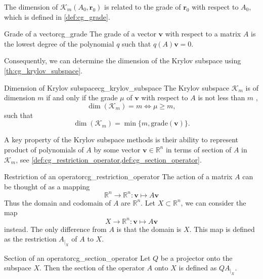 The dimension of $\mathcal{K}_m(A_0, \mathbf{r}_0)$ is related to the grade of $\mathbf{r}_0$ with respect to $A_0$, which is defined in \cref{def:cg_grade}.
\begin{fancydef}{Grade of a vector}{cg_grade}
  The grade of a vector $\mathbf{v}$ with respect to a matrix $A$ is the lowest degree of the polynomial $q$ such that $q(A)\mathbf{v} = 0$.
\end{fancydef}
Consequently, we can determine the dimension of the Krylov subspace using \cref{th:cg_krylov_subspace}.
\begin{fancyth}{Dimension of Krylov subspace}{cg_krylov_subspace}
  The Krylov subspace $\mathcal{K}_m$ is of dimension $m$ if and only if the grade $\mu$ of $\mathbf{v}$ with respect to $A$ is not less than $m$ \cite[proposition 6.2]{iter_method_saad},
  \begin{equation*}
    \dim(\mathcal{K}_m) = m \iff \mu \geq m,
  \end{equation*}
  such that
  \begin{equation}
    \dim(\mathcal{K}_m) = \min \{m, \textrm{grade}(\mathbf{v})\}.
    \label{eq:cg_krylov_dimension}
  \end{equation}
\end{fancyth}

A key property of the Krylov subspace methods is their ability to represent product of polynomials of $A$ by some vector $\mathbf{v} \in \mathbb{R}^n$ in terms of section of $A$ in $\mathcal{K}_m$, see \cref{def:cg_restriction_operator,def:cg_section_operator}.
\begin{fancydef}{Restriction of an operator}{cg_restriction_operator}
  The action of a matrix $A$ can be thought of as a mapping
  \begin{equation*}
    \mathbb{R}^n \rightarrow \mathbb{R}^n: \mathbf{v} \mapsto A \mathbf{v}
  \end{equation*}
  Thus the domain and codomain of $A$ are $\mathbb{R}^n$. Let $X \subset \mathbb{R}^n$, we can consider the map
  \begin{equation*}
    X \rightarrow \mathbb{R}^n: \mathbf{v} \mapsto A \mathbf{v}
  \end{equation*}
  instead. The only difference from $A$ is that the domain is $X$. This map is defined as the restriction $A_{\left.\right|_X}$ of $A$ to $X$.
\end{fancydef}
\begin{fancydef}{Section of an operator}{cg_section_operator}
  Let $Q$ be a projector onto the subspace $X$. Then the section of the operator $A$ onto $X$ is defined as $QA_{\left.\right|_X}$.
\end{fancydef}

